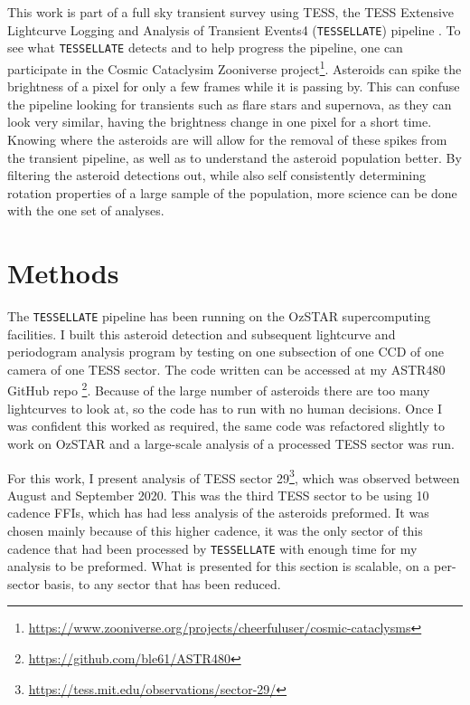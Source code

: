 \documentclass{UCreport}
\begin{document}
This work is part of a full sky transient survey using TESS, the TESS Extensive Lightcurve Logging and Analysis of Transient Events4 (\texttt{TESSELLATE}) pipeline \citep{TESSELLATE}.
To see what \texttt{TESSELLATE} detects and to help progress the pipeline, one can participate in the Cosmic Cataclysim Zooniverse project\footnote{\href{https://www.zooniverse.org/projects/cheerfuluser/cosmic-cataclysms}{https://www.zooniverse.org/projects/cheerfuluser/cosmic-cataclysms}}.
Asteroids can spike the brightness of a pixel for only a few frames while it is passing by.
This can confuse the pipeline looking for transients such as flare stars and supernova, as they can look very similar, having the brightness change in one pixel for a short time.
Knowing where the asteroids are will allow for the removal of these spikes from the transient pipeline, as well as to understand the asteroid population better.
By filtering the asteroid detections out, while also self consistently determining rotation properties of a large sample of the population, more science can be done with the one set of analyses.


\section{Methods}\label{Sec:Meth}

The \texttt{TESSELLATE} pipeline has been running on the OzSTAR supercomputing facilities.
I built this asteroid detection and subsequent lightcurve and periodogram analysis program by testing on one subsection of one CCD of one camera  of one TESS sector.
The code written can be accessed at my ASTR480 GitHub repo \footnote{\href{https://github.com/ble61/ASTR480}{https://github.com/ble61/ASTR480}}. 
Because of the large number of asteroids there are too many lightcurves to look at, so the code has to run with no human decisions. 
Once I was confident this worked as required, the same code was refactored slightly to work on OzSTAR and a large-scale analysis of a processed TESS sector was run.

For this work, I present analysis of TESS sector 29\footnote{\url{https://tess.mit.edu/observations/sector-29/}}, which was observed between  August and  September 2020.
This was the third TESS sector to be using \qty{10}{\min} cadence FFIs, which has had less analysis of the asteroids preformed.
It was chosen mainly because of this higher cadence, it was the only sector of this cadence that had been processed by \texttt{TESSELLATE} with enough time for my analysis to be preformed.
What is presented for this section is scalable, on a per-sector basis, to any sector that has been reduced.
\end{document}
